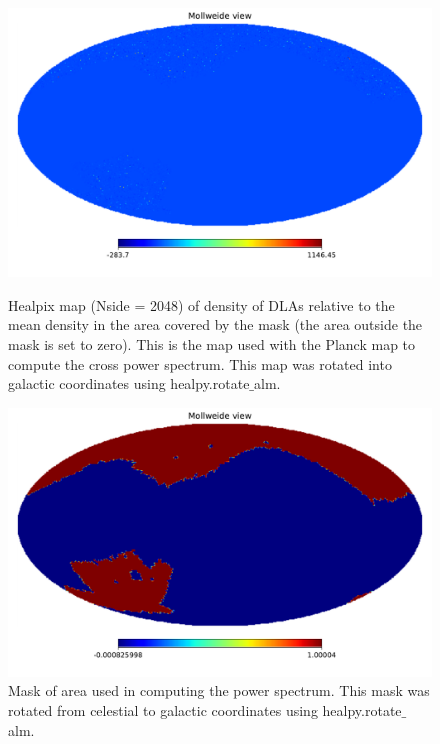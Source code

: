 \documentclass{amsart}
\begin{document}
\begin{figure}
  \includegraphics[width=\linewidth]{dla_map.pdf}
  \caption{Healpix map (Nside = 2048) of density of DLAs relative to the mean density in the area covered by the mask (the area outside the mask is set to zero). This is the map used with the Planck map to compute the cross power spectrum. This map was rotated into galactic coordinates using healpy.rotate$\_$alm. }
  \label{fig:dlamap}
\break \indent \break
  \includegraphics[width=\linewidth]{dla_mask.pdf}
  \caption{Mask of area used in computing the power spectrum. This mask was rotated from celestial to galactic coordinates using healpy.rotate$\_$alm. }
  \label{fig:dlamask}
\end{figure}
\end{document}
